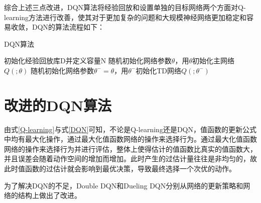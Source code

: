综合上述三点改进，DQN算法将经验回放和设置单独的目标网络两个方面对Q-learning方法进行改善，使其对于更加复杂的问题和大规模神经网络更加稳定和容易收敛，DQN的算法流程如下：

\begin{algorithm}[H]  
	\caption{DQN算法}%
	初始化经验回放库D并定义容量N\;
    随机初始化网络参数$\theta$，用$\theta$初始化主网络$Q(; \theta)$\;
    随机初始化网络参数$\theta^{-}=\theta$，用$\theta^{-}$初始化TD网络$Q(; \theta^{-})$\;
\end{algorithm}

\section{改进的DQN算法} %

由式\ref{Q-learning}与式\ref{DQN}可知，不论是Q-learning还是DQN，值函数的更新公式中均有最大化操作，通过最大化值函数网络的操作来选择行为。通过最大化值函数网络的操作来选择行为并进行评估，整体上使得估计的值函数比真实的值函数大，并且误差会随着动作空间的增加而增加。此时产生的过估计量往往是非均匀的，故此时值函数的过估计就会影响到最优决策，导致最终选择一个次优的动作。

为了解决DQN的不足，Double DQN和Dueling DQN分别从网络的更新策略和网络的结构上做出了改进。

